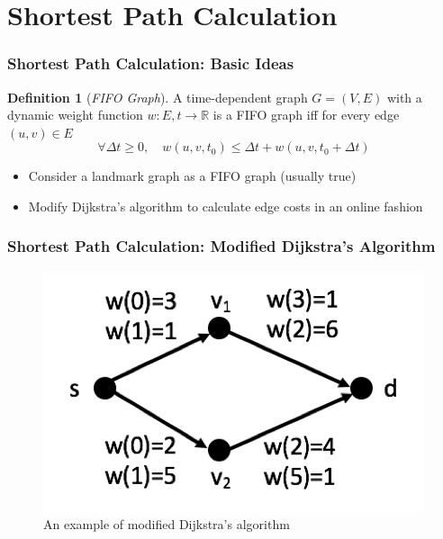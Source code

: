 \documentclass{beamer}
\theoremstyle{definition}
\newtheorem{defn}{Definition}
\begin{document}
\section{Shortest Path Calculation}
\begin{frame}
\frametitle{Shortest Path Calculation: Basic Ideas}
\begin{defn}[\emph{FIFO Graph}]\label{Def:fifo_graph}
A time-dependent graph $G=(V,E)$ with a dynamic weight function $w : E,t \rightarrow \mathbb{R}$ is a FIFO graph iff for every edge $(u, v) \in E$
\begin{equation}
\forall \Delta t \geq 0, \quad w(u, v, t_{0}) \leq \Delta t + w(u, v, t_{0} + \Delta t)
\end{equation}
\end{defn}

\begin{itemize}
	\item <2-> Consider a landmark graph as a FIFO graph (usually true)
	\item <3-> Modify Dijkstra's algorithm to calculate edge costs in an online fashion
\end{itemize}

\end{frame}

\begin{frame}
\frametitle{Shortest Path Calculation: Modified Dijkstra's Algorithm}
\begin{figure}[h!]
\includegraphics[scale=1]{shortest_path_demo}
\centering
\caption{An example of modified Dijkstra's algorithm}\label{Fig:dynamic_update}
\end{figure}

\end{frame}
\end{document}
